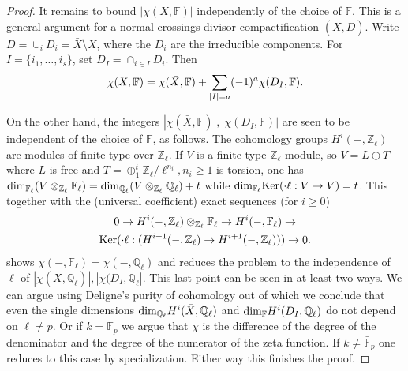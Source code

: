 \documentclass[12pt]{amsart}
\theoremstyle{plain}
\theoremstyle{definition}
\numberwithin{thm}{section}
\newcommand{\ml}[2]{\begin{multline}\label{#1}#2 \end{multline}}
\newcommand{\ga}[2]{\begin{gather}\label{#1}#2 \end{gather}}
\newcommand{\F}{{\mathbb F}}
\newcommand{\Q}{{\mathbb Q}}
\newcommand{\Z}{{\mathbb Z}}
\numberwithin{equation}{section}
\begin{document}
\begin{proof}
It remains to bound $|\chi(X, \F)|$ independently of the choice of $\F$. This is a general argument for a normal crossings divisor compactification $(\bar X,D)$.  Write $D=\cup_i D_i=\bar X\setminus X$, where the $D_i$ are the irreducible components. 
For $I=\{i_1,\ldots, i_s\}$, set $D_I=\cap_{i\in I} D_i$. Then 
\ga{}{ \chi(X, \F)=\chi(\bar X, \F) +\sum_{|I|=a} (-1)^a \chi( D_I, \F).\notag} 

On the other hand, the integers  $|\chi(\bar X, \F)|, |\chi(D_I, \F)|$ are seen to be independent of the choice of $\F$, as follows. The cohomology groups $H^i(-, \Z_\ell)$ are modules of finite type over $\Z_\ell$.  
If $V$ is a finite type $\Z_\ell$-module, so $V=L\oplus T$ where $L$ is  free and $T=\oplus_1^t \Z_\ell/\ell^{n_i}, n_i\ge 1$ is torsion, one has ${\rm dim}_{\F_\ell} (V\otimes_{\Z_\ell} \F_\ell)={\rm dim}_{\Q_\ell} (V\otimes_{\Z_\ell} \Q_\ell )+t$ while ${\rm dim}_{\F_\ell} 
{\rm Ker} (\cdot \ell: V\to V)=t$.  This together with the (universal coefficient) exact sequences (for $i\geq 0$) 
\ml{}{ 0\to H^i(-,\Z_\ell)\otimes_{\Z_\ell} \F_\ell \to H^i(-,\F_\ell) \to\\ {\rm Ker} (\cdot \ell: (H^{i+1}(-,\Z_\ell) \to H^{i+1}(-,\Z_\ell))) \to 0. \notag}
shows  $\chi(-, \F_\ell)=\chi(-, \Q_\ell)$ and reduces the problem to the independence of $\ell$ of  $|\chi(\bar X, \Q_\ell)|, |\chi(D_I, \Q_\ell|.$  This last  point can be seen in at least two ways.  We can argue using Deligne's purity of cohomology \cite[Th\'eor\`eme~3.3.1]{Del80} out of which we conclude that even the single dimensions  ${\rm dim}_{ \Q_\ell} H^i(\bar X, \Q_\ell)$  and ${\rm dim}_{\F} H^i(D_I, \Q_\ell)$ do  not depend on $\ell\neq p$. Or if $k=\bar \F_p$ we argue that $\chi$ is  the difference of the degree of the denominator and the degree of the numerator of the  zeta function. If $k\neq \bar \F_p$ one reduces to this case by specialization. Either way this finishes the proof. 



\end{proof}
\end{document}
